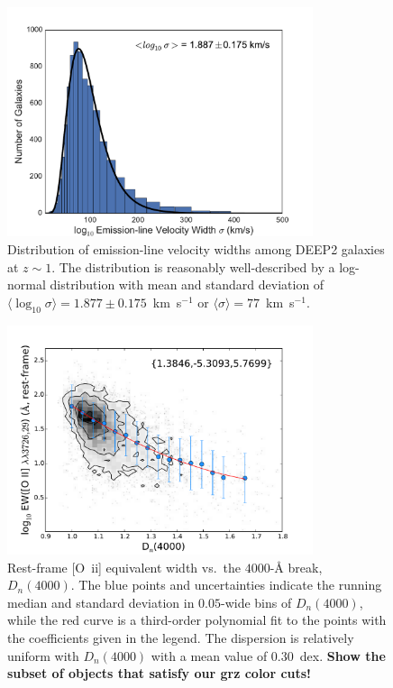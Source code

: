 \documentclass[12pt]{article}
\newcommand{\oii}{[O~{\sc ii}]}
\newcommand{\kms}{km~s$^{-1}$}
\begin{document}
\begin{figure}
\centering
\includegraphics[width=0.8\textwidth]{figures/linesigma.pdf}
\caption{Distribution of emission-line velocity widths among DEEP2 galaxies at
  $z\sim1$.  The distribution is reasonably well-described by a log-normal
  distribution with mean and standard deviation of
  $\langle\log_{10}\sigma\rangle=1.877\pm0.175$~\kms{} or
  $\langle\sigma\rangle=77$~\kms.  \label{fig:linesigma}}
\end{figure}

\begin{figure}
\centering
\includegraphics[width=0.8\textwidth]{figures/d4000_ewoii.pdf}
\caption{Rest-frame \oii{} equivalent width vs.~the $4000$-\AA{}
  break, $D_{n}(4000)$.  The blue points and uncertainties indicate
  the running median and standard deviation in $0.05$-wide bins of
  $D_{n}(4000)$, while the red curve is a third-order polynomial fit
  to the points with the coefficients given in the
  legend.  The dispersion is relatively uniform with $D_{n}(4000)$
  with a mean value of $0.30$~dex.  {\bf Show the subset of objects
    that satisfy our grz color cuts!}  \label{fig:d4000}}
\end{figure}
\end{document}
